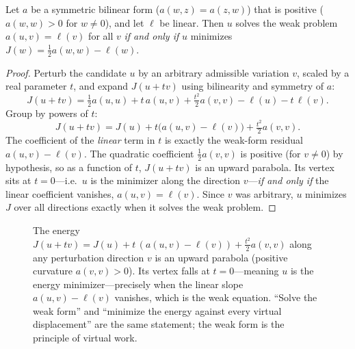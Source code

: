 \begin{proposition}
\label{prop:varequiv}
Let $a$ be a symmetric bilinear form ($a(w,z)=a(z,w)$) that is positive
($a(w,w)>0$ for $w\neq0$), and let $\ell$ be linear. Then $u$ solves the weak
problem $a(u,v)=\ell(v)$ for all $v$ \emph{if and only if} $u$ minimizes
$J(w)=\tfrac12 a(w,w)-\ell(w)$.
\end{proposition}

\begin{proof}
Perturb the candidate $u$ by an arbitrary admissible variation $v$, scaled by a
real parameter $t$, and expand $J(u+tv)$ using bilinearity and symmetry of $a$:
\[
  J(u+tv) = \tfrac12 a(u,u) + t\,a(u,v) + \tfrac{t^2}{2}a(v,v) - \ell(u) - t\,\ell(v).
\]
Group by powers of $t$:
\[
  J(u+tv) = J(u) + t\bigl(a(u,v)-\ell(v)\bigr) + \tfrac{t^2}{2}a(v,v).
\]
The coefficient of the \emph{linear} term in $t$ is exactly the weak-form
residual $a(u,v)-\ell(v)$. The quadratic coefficient $\tfrac12 a(v,v)$ is
positive (for $v\neq0$) by hypothesis, so as a function of $t$, $J(u+tv)$ is an
upward parabola. Its vertex sits at $t=0$---i.e.\ $u$ is the minimizer along the
direction $v$---\emph{if and only if} the linear coefficient vanishes,
$a(u,v)=\ell(v)$. Since $v$ was arbitrary, $u$ minimizes $J$ over all directions
exactly when it solves the weak problem.
\end{proof}

\begin{figure}[t]
\centering
{}
\caption[The weak form as energy minimization]{The energy
$J(u+tv)=J(u)+t\,(a(u,v)-\ell(v))+\tfrac{t^2}{2}a(v,v)$ along any perturbation
direction $v$ is an upward parabola (positive curvature $a(v,v)>0$). Its vertex
falls at $t=0$---meaning $u$ is the energy minimizer---precisely when the linear
slope $a(u,v)-\ell(v)$ vanishes, which is the weak equation. ``Solve the weak
form'' and ``minimize the energy against every virtual displacement'' are the
same statement; the weak form is the principle of virtual work.}
\label{fig:virtualwork}
\end{figure}

